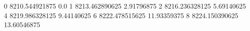 0 8210.544921875 0.0
1 8213.462890625 2.91796875
2 8216.236328125 5.69140625
4 8219.986328125 9.44140625
6 8222.478515625 11.93359375
8 8224.150390625 13.60546875
